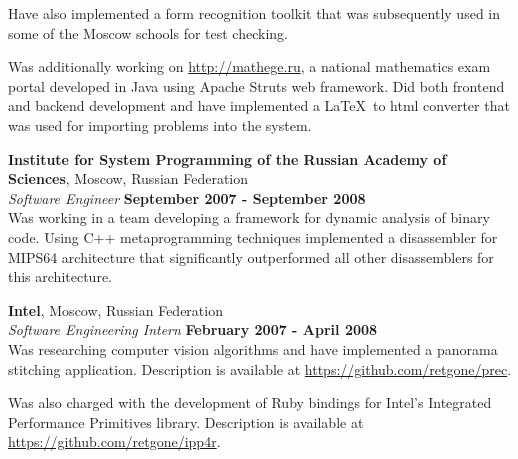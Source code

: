 \documentclass[margin,line]{CV}
\begin{document}
\begin{resume}
    Have also implemented a form recognition toolkit that was subsequently used in some of the Moscow schools for test checking. 

    Was additionally working on \url{http://mathege.ru}, a national mathematics exam portal developed in Java using Apache Struts web framework. Did both frontend and backend development and have implemented a \LaTeX~to html converter that was used for importing problems into the system.

    
    
    \textbf{Institute for System Programming of the Russian Academy of Sciences}, Moscow, Russian Federation \vspace{2mm}\\\vspace{1mm}%
    \textsl{Software Engineer} \hfill \textbf{September 2007 - September 2008}\\
    Was working in a team developing a framework for dynamic analysis of binary code. Using C++ metaprogramming techniques implemented a disassembler for MIPS64 architecture that significantly outperformed all other disassemblers for this architecture.

    
   
    \textbf{Intel}, Moscow, Russian Federation \vspace{2mm}\\\vspace{1mm}%
    \textsl{Software Engineering Intern} \hfill \textbf{February 2007 - April 2008}\\
    Was researching computer vision algorithms and have implemented a panorama stitching application. Description is available at \url{https://github.com/retgone/prec}.

    Was also charged with the development of Ruby bindings for Intel's Integrated Performance Primitives library. Description is available at \url{https://github.com/retgone/ipp4r}.
    

\end{resume}
\end{document}
